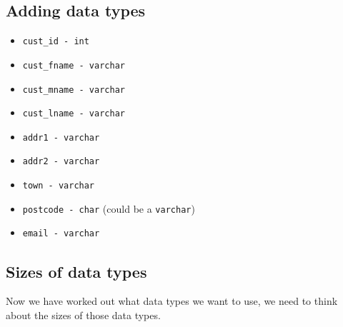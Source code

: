 \subsection*{Adding data types}
\begin{itemize}
    \item \texttt{cust\_id - int}
    \item \texttt{cust\_fname - varchar}
    \item \texttt{cust\_mname - varchar}
    \item \texttt{cust\_lname - varchar}
    \item \texttt{addr1 - varchar}
    \item \texttt{addr2 - varchar}
    \item \texttt{town - varchar}
    \item \texttt{postcode - char} (could be a \texttt{varchar})
    \item \texttt{email - varchar}
\end{itemize}

\subsection*{Sizes of data types}
Now we have worked out what data types we want to use, we need to think about the sizes of those data types.

